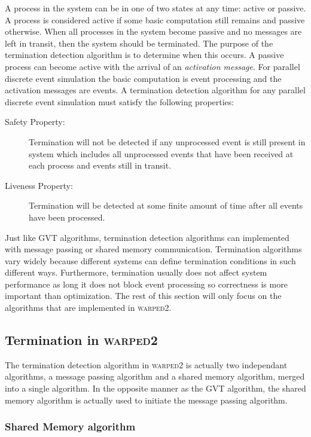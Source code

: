 \documentclass[11pt]{book}
\begin{document}
A process in the system can be in one of two states at any time: active or passive.  A process
is considered active if some basic computation still remains and passive otherwise.
When all processes in the system become passive and no messages are left in transit, then
the system should be terminated.  The purpose of the termination detection algorithm is to
determine when this occurs.  A passive process can become active with the arrival of an
\emph{activation message}.  For parallel discrete event simulation the basic computation is
event processing and the activation messages are events.  A termination detection algorithm for
any parallel discrete event simulation must satisfy the following properties:

\begin{description}
    \item[Safety Property:] Termination will not be detected if any unprocessed event is still
        present in system which includes all unprocessed events that have been received at each
        process and events still in transit.
    \item[Liveness Property:] Termination will be detected at some finite amount of time after
        all events have been processed.
\end{description}

Just like GVT algorithms, termination detection algorithms can implemented with message
passing or shared memory communication.  Termination algorithms vary widely because different
systems can define termination conditions in such different ways.  Furthermore, termination
usually does not affect system performance as long it does not block event processing so
correctness is more important than optimization.  The rest of this section will only focus
on the algorithms that are implemented in \textsc{warped2}.

\subsection{Termination in \textsc{warped2}}

The termination detection algorithm in \textsc{warped2} is actually two independant algorithms,
a message passing algorithm and a shared memory algorithm, merged into a single algorithm.  In
the opposite manner as the GVT algorithm, the shared memory algorithm is actually used to initiate
the message passing algorithm.

\subsubsection{Shared Memory algorithm}
\end{document}

